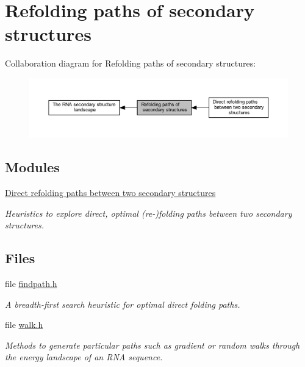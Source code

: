 \hypertarget{group__paths}{}\section{Refolding paths of secondary structures}
\label{group__paths}
Collaboration diagram for Refolding paths of secondary structures\+:
\nopagebreak
\begin{figure}[H]
\begin{center}
\leavevmode
\includegraphics[width=350pt]{group__paths}
\end{center}
\end{figure}
\subsection*{Modules}
\begin{DoxyCompactItemize}
\item 
\hyperlink{group__direct__paths}{Direct refolding paths between two secondary structures}
\begin{DoxyCompactList}\small\item\em Heuristics to explore direct, optimal (re-\/)folding paths between two secondary structures. \end{DoxyCompactList}\end{DoxyCompactItemize}
\subsection*{Files}
\begin{DoxyCompactItemize}
\item 
file \hyperlink{findpath_8h}{findpath.\+h}
\begin{DoxyCompactList}\small\item\em A breadth-\/first search heuristic for optimal direct folding paths. \end{DoxyCompactList}\item 
file \hyperlink{walk_8h}{walk.\+h}
\begin{DoxyCompactList}\small\item\em Methods to generate particular paths such as gradient or random walks through the energy landscape of an R\+NA sequence. \end{DoxyCompactList}\end{DoxyCompactItemize}
